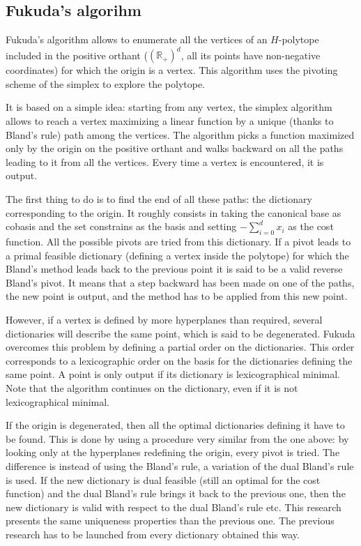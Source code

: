 \subsection{Fukuda's algorihm}

Fukuda's algorithm allows to enumerate all the vertices of an $H$-polytope included in the positive orthant ($(\mathbb{R}_+)^d$, all its points have non-negative coordinates) for which the origin is a vertex. This algorithm uses the pivoting scheme of the simplex to explore the polytope. 

It is based on a simple idea: starting from any vertex, the simplex algorithm allows to reach a vertex maximizing a linear function by a unique (thanks to Bland's rule) path among the vertices. The algorithm picks a function maximized only by the origin on the positive orthant and walks backward on all the paths leading to it from all the vertices. Every time a vertex is encountered, it is output.

The first thing to do is to find the end of all these paths: the dictionary corresponding to the origin. It roughly consists in taking the canonical base as cobasis and the set constrains as the basis and setting $-\sum_{i=0}^d x_i$ as the cost function. All the possible pivots are tried from this dictionary. If a pivot leads to a primal feasible dictionary (defining a vertex inside the polytope) for which the Bland's method leads back to the previous point it is said to be a valid reverse Bland's pivot. It means that a step backward has been made on one of the paths, the new point is output, and the method has to be applied from this new point.

However, if a vertex is defined by more hyperplanes than required, several dictionaries will describe the same point, which is said to be degenerated. Fukuda overcomes this problem by defining a partial order on the dictionaries. This order corresponds to a lexicographic order on the basis for the dictionaries defining the same point. A point is only output if its dictionary is lexicographical minimal. Note that the algorithm continues on the dictionary, even if it is not lexicographical minimal.

If the origin is degenerated, then all the optimal dictionaries defining it have to be found. This is done by using a procedure very similar from the one above: by looking only at the hyperplanes redefining the origin, every pivot is tried. The difference is instead of using the Bland's rule, a variation of the dual Bland's rule is used. If the new dictionary is dual feasible (still an optimal for the cost function) and the dual Bland's rule brings it back to the previous one, then the new dictionary is valid with respect to the dual Bland's rule etc. This research presents the same uniqueness properties than the previous one. The previous research has to be launched from every dictionary obtained this way.

